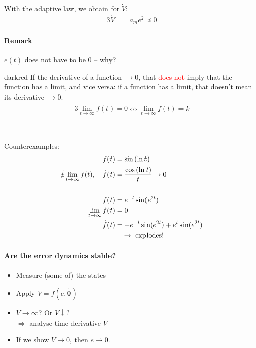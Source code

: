 With the adaptive law, we obtain for $\dot{V}$:
\begin{alignat}{3}
\dot{V} &= a_m e^2 \preceq 0 \label{eq:Vdot}
\end{alignat}

\paragraph{Remark}
$e(t)$ does not have to be 0 -- why?

\begin{conclusion}{darkred}
If the derivative of a function $\rightarrow 0$,
that \textcolor{red}{does not} imply that the function
has a limit, and vice versa:
if a function has a limit, that doesn't mean its
derivative $\rightarrow 0$.
\begin{alignat*}{3}
\lim_{t \rightarrow \infty} \dot{f}(t) = 0
    \nLeftrightarrow \lim_{t \rightarrow \infty} f(t) = k
\end{alignat*}
\end{conclusion}~

Counterexamples:
\begin{align*}
f(t) &= \sin \left( \ln t \right)\\
\nexists \lim_{t \rightarrow \infty} f(t), \quad
\dot{f}(t) &= \frac{\cos \left( \ln t \right)}{t} \rightarrow 0\\
~\\
f(t) &= e^{-t} \sin (e^{2t})\\
 \lim_{t \rightarrow \infty} f(t) &= 0\\
\dot{f}(t) &= -e^{-t}\sin(e^{2t}) + e^t \sin(e^{2t}) \\
    & \quad \rightarrow    \textnormal{ explodes!}
\end{align*}

\paragraph{Are the error dynamics stable?}
\begin{itemize}
\item Measure (some of) the states
\item Apply $V = f(e, \tilde{\bm{\theta}})$
\item $V \rightarrow \infty$? Or $V \downarrow$?\\
    $\Rightarrow$ analyse time derivative $\dot{V}$
\item If we show $\dot{V} \rightarrow 0$, then $e \rightarrow 0$.
\end{itemize}

